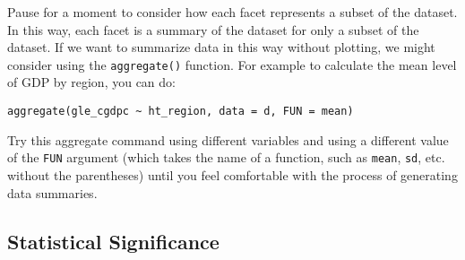 \documentclass[a4paper,12pt]{article}
\begin{document}
\begin{enumerate*}
\item Pause for a moment to consider how each facet represents a subset of the dataset. In this way, each facet is a summary of the dataset for only a subset of the dataset. If we want to summarize data in this way without plotting, we might consider using the \texttt{aggregate()} function. For example to calculate the mean level of GDP by region, you can do:

\begin{verbatim}
aggregate(gle_cgdpc ~ ht_region, data = d, FUN = mean)
\end{verbatim}

\noindent Try this aggregate command using different variables and using a different value of the \texttt{FUN} argument (which takes the name of a function, such as \texttt{mean}, \texttt{sd}, etc. without the parentheses) until you feel comfortable with the process of generating data summaries.



\end{enumerate*}

\subsection{Statistical Significance}
\end{document}
